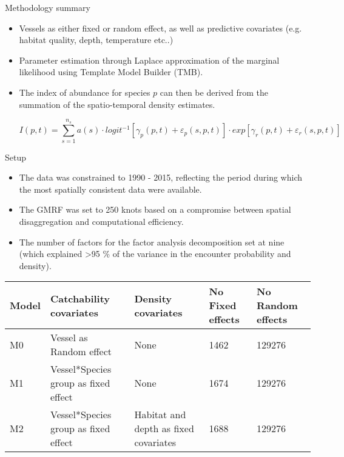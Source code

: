 \documentclass[xcolor=x11names,compress]{beamer}
\renewcommand{\(}{\begin{columns}}
\renewcommand{\)}{\end{columns}}
\newcommand{\<}[1]{\begin{column}{#1}}
\renewcommand{\>}{\end{column}}
\begin{document}
\begin{frame}{Methodology summary}
	\begin{itemize}
	\setlength\itemsep{2em}
	\small

	\item Vessels as either fixed or random effect, as well as predictive
		covariates (e.g. habitat quality, depth, temperature etc..) 
	\item Parameter estimation through Laplace approximation of the
		marginal likelihood using Template Model Builder (TMB).

	\item The index of abundance for species $p$ can then be derived from
		the summation of the spatio-temporal density estimates. 
		
		\begin{equation} I(p,t) =
			\sum_{s=1}^{n_{s}} a(s) \cdot
			logit^{-1}[\gamma_{p}(p,t) + \varepsilon_{p}(s,p,t)]
			\cdot exp[\gamma_{r}(p,t) + \varepsilon_{r}(s,p,t)]
		\end{equation}
\end{itemize}

\end{frame}

\begin{frame}{Setup}

\begin{itemize}
	\setlength\itemsep{2em}
	\small
	\item The data was constrained to 1990 - 2015, reflecting the period
		during which the most spatially consistent data were available.
	\item The GMRF was set to 250 knots based on a compromise between
		spatial disaggregation and computational efficiency.
	\item The number of factors for the factor analysis decomposition set
		at nine (which explained \textgreater 95 \% of the variance in
		the encounter probability and density).
\end{itemize}

\begin{table}[!htb]
	\tiny
	\center
	\begin{tabular}{ p{1cm} p{2cm} p{2cm} p{1cm} p{1cm} }
		\hline
		Model & Catchability covariates & Density covariates & No Fixed
		effects & No Random effects \\
		\hline
		M0 & Vessel as Random effect & None  & 1462 & 129276 \\
		M1 & Vessel*Species group as fixed effect & None & 1674 & 129276   \\
		M2 & Vessel*Species group as fixed effect & Habitat and depth
		as fixed covariates & 1688 & 129276 \\ 
		\hline
	\end{tabular}
\end{table}

\end{frame}
\end{document}
